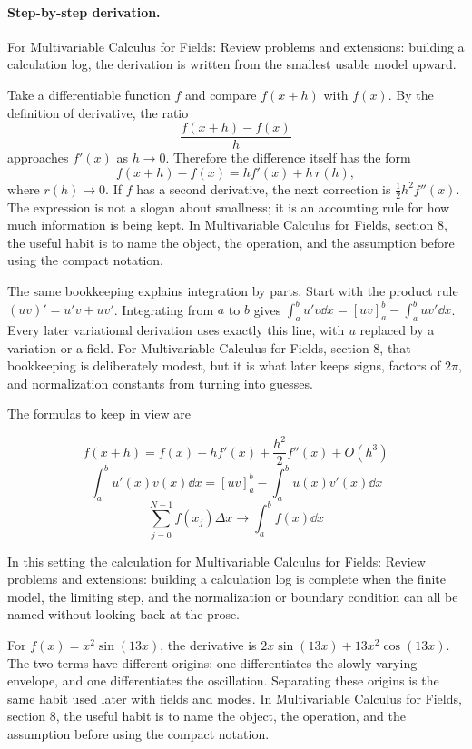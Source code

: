 \paragraph{Step-by-step derivation.}

For Multivariable Calculus for Fields: Review problems and extensions: building a calculation log, the derivation is written from the smallest usable model upward.

Take a differentiable function \(f\) and compare \(f(x+h)\) with \(f(x)\).  By the definition of derivative, the ratio
\[
  \frac{f(x+h)-f(x)}{h}
\]
approaches \(f'(x)\) as \(h\to0\).  Therefore the difference itself has the form
\[
  f(x+h)-f(x)=hf'(x)+h\,r(h),
\]
where \(r(h)\to0\).  If \(f\) has a second derivative, the next correction is \(\frac12h^2f''(x)\).  The expression is not a slogan about smallness; it is an accounting rule for how much information is being kept.  In Multivariable Calculus for Fields, section 8, the useful habit is to name the object, the operation, and the assumption before using the compact notation.

The same bookkeeping explains integration by parts.  Start with the product rule \((uv)'=u'v+uv'\).  Integrating from \(a\) to \(b\) gives \(\int_a^b u'v\dd x=[uv]_a^b-\int_a^buv'\dd x\).  Every later variational derivation uses exactly this line, with \(u\) replaced by a variation or a field.  For Multivariable Calculus for Fields, section 8, that bookkeeping is deliberately modest, but it is what later keeps signs, factors of \(2\pi\), and normalization constants from turning into guesses.

The formulas to keep in view are

\[
  f(x+h)=f(x)+hf'(x)+\frac{h^2}{2}f''(x)+O(h^3)
\]
\[
  \int_a^b u'(x)v(x)\dd x=[uv]_a^b-\int_a^b u(x)v'(x)\dd x
\]
\[
  \sum_{j=0}^{N-1}f(x_j)\Delta x\longrightarrow \int_a^b f(x)\dd x
\]

In this setting the calculation for Multivariable Calculus for Fields: Review problems and extensions: building a calculation log is complete when the finite model, the limiting step, and the normalization or boundary condition can all be named without looking back at the prose.




\begin{example}
For \(f(x)=x^2\sin(13x)\), the derivative is \(2x\sin(13x)+13x^2\cos(13x)\).  The two terms have different origins: one differentiates the slowly varying envelope, and one differentiates the oscillation.  Separating these origins is the same habit used later with fields and modes.  In Multivariable Calculus for Fields, section 8, the useful habit is to name the object, the operation, and the assumption before using the compact notation.
\end{example}



